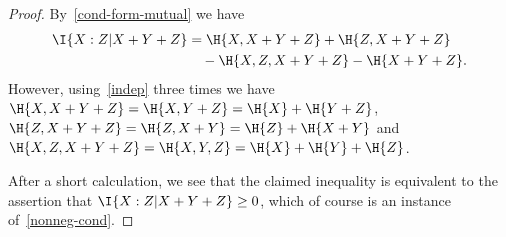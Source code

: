 \begin{proof}
By~\eqref{cond-form-mutual} we have
\begin{align*}
\I{ X : Z | X+Y+Z} &= \H{X, X+Y+Z} + \H{Z, X+Y+Z} \\
&\quad - \H{X, Z, X+Y+Z} - \H{X+Y+Z}.
\end{align*}
However, using~\eqref{indep} three times we have $\H{X, X+Y+Z} = \H{X, Y+Z} = \H{X} + \H{Y+Z}$, $\H{Z, X+Y + Z} = \H{Z, X+Y} = \H{Z} + \H{X+Y}$ and $\H{X, Z, X+Y+Z} = \H{X, Y, Z} = \H{X} + \H{Y} + \H{Z}$.

After a short calculation, we see that the claimed inequality is equivalent to the assertion that $\I{ X : Z | X+Y+Z} \geq 0$, which of course is an instance of~\eqref{nonneg-cond}.
\end{proof}



